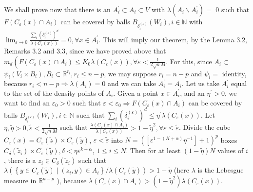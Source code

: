 \documentclass[10pt]{article}
\begin{document}
We shall prove now that there is an $A_{i}^{\prime} \subset A_{i} \subset V$ with $\lambda\left(A_{i} \backslash A_{i}^{\prime}\right)=$ 0 such that $F\left(C_{\varepsilon}(x) \cap A_{i}\right)$ can be covered by balls $B_{\delta_{i}^{(\varepsilon)}}\left(W_{i}\right), i \in \mathbb{N}$ with $\lim _{\varepsilon \rightarrow 0} \frac{\sum_{i}\left(\delta_{i}^{(\varepsilon)}\right)^{d}}{\lambda\left(C_{\varepsilon}(x)\right)}=0, \forall x \in A_{i}^{\prime}$. This will imply our theorem, by the Lemma 3.2, Remarks 3.2 and 3.3, since we have proved above that $m_{d}\left(F\left(C_{\varepsilon}(x) \cap A_{i}\right) \leq K_{0} \lambda\left(C_{\varepsilon}(x)\right), \forall \varepsilon<\frac{1}{2 \sqrt{n} M}\right.$. For this, since $A_{i} \subset$ $\psi_{i}\left(V_{i} \times B_{i}\right), B_{i} \subset \mathbb{R}^{r_{i}}, r_{i} \leq n-p$, we may suppose $r_{i}=n-p$ and $\psi_{i}=$ identity, because $r_{i}<n-p \Rightarrow \lambda\left(A_{i}\right)=0$ and we can take $A_{i}^{\prime}=A_{i}$. Let us take $A_{i}^{\prime}$ equal to the set of the density points of $A_{i}$. Given a point $x \in A_{i}^{\prime}$, and an $\eta^{\prime}>0$, we want to find an $\varepsilon_{0}>0$ such that $\varepsilon<\varepsilon_{0} \Rightarrow F\left(C_{\varepsilon}(x) \cap A_{i}\right)$ can be covered by balls $B_{\delta_{i}^{(\varepsilon)}}\left(W_{i}\right), i \in \mathbb{N}$ such that $\sum_{i}\left(\delta_{i}^{(\varepsilon)}\right)^{d} \leq \eta^{\prime} \lambda\left(C_{\varepsilon}(x)\right)$. Let $\eta, \tilde{\eta}>0, \tilde{\varepsilon}<\frac{1}{2 \sqrt{n} M}$ such that $\frac{\lambda\left(C_{\varepsilon}(x) \cap A_{i}\right)}{\lambda\left(C_{\varepsilon}(x)\right)}>1-\tilde{\eta}^{2}, \forall \varepsilon \leq \tilde{\varepsilon}$. Divide the cube $C_{\varepsilon}(x)=C_{\varepsilon}(\widetilde{z}) \times C_{\varepsilon}(\widetilde{y})$, $\varepsilon<\tilde{\varepsilon}$ into $N=\left(\left[\varepsilon^{1-(K+\alpha)} \eta^{-1}\right]+1\right)^{p}$ boxes $C_{\delta}\left(\widetilde{z}_{i}\right) \times C_{\varepsilon}(\widetilde{y}), \delta<\eta \varepsilon^{k+\alpha}$, $1 \leq i \leq N$. Then for at least $(1-\tilde{\eta}) N$ values of $i$, there is a $z_{i} \in C_{\delta}\left(\widetilde{z}_{i}\right)$ such that $\lambda\left(\left\{y \in C_{\varepsilon}(\widetilde{y}) \mid\left(z_{i}, y\right) \in A_{i}\right\} / \lambda\left(C_{\varepsilon}(\widetilde{y})\right)>1-\tilde{\eta}\right.$ (here $\lambda$ is the Lebesgue measure in $\mathbb{R}^{n-p}$ ), because $\lambda\left(C_{\varepsilon}(x) \cap A_{i}\right)>\left(1-\tilde{\eta}^{2}\right) \lambda\left(C_{\varepsilon}(x)\right)$.
\end{document}
